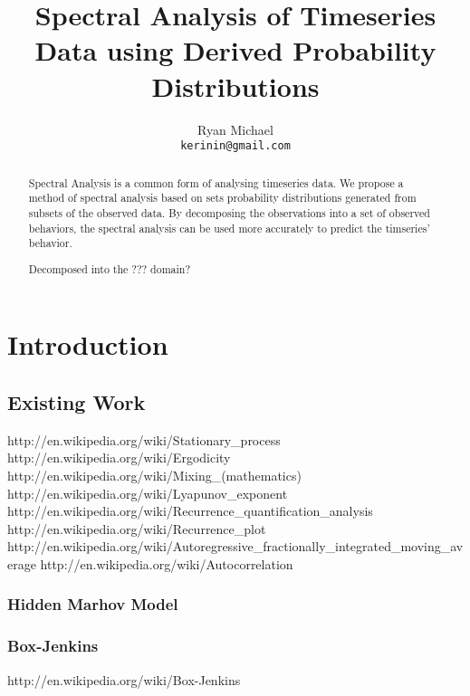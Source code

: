 \documentclass[10pt]{article}
\begin{document}
\title{Spectral Analysis of Timeseries Data using Derived Probability Distributions}
\author{Ryan Michael\\ \texttt{kerinin@gmail.com}}
\maketitle

\begin{abstract}
Spectral Analysis is a common form of analysing timeseries data.  We propose a method of spectral analysis based on sets probability distributions generated from subsets of the observed data.  By decomposing the observations into a set of observed behaviors, the spectral analysis can be used more accurately to predict the timseries' behavior.

Decomposed into the ??? domain?
\end{abstract}

\section{Introduction}

\subsection{Existing Work}
http://en.wikipedia.org/wiki/Stationary_process
http://en.wikipedia.org/wiki/Ergodicity
http://en.wikipedia.org/wiki/Mixing_(mathematics)
http://en.wikipedia.org/wiki/Lyapunov_exponent
http://en.wikipedia.org/wiki/Recurrence_quantification_analysis
http://en.wikipedia.org/wiki/Recurrence_plot
http://en.wikipedia.org/wiki/Autoregressive_fractionally_integrated_moving_average
http://en.wikipedia.org/wiki/Autocorrelation

\subsubsection{Hidden Marhov Model}

\subsubsection{Box-Jenkins}
http://en.wikipedia.org/wiki/Box-Jenkins
\end{document}
